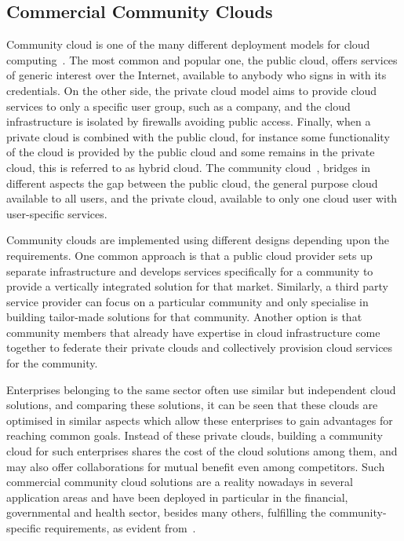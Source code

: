 
\subsection{Commercial Community Clouds}
\label{sec__community_clouds_enterprise}

Community cloud is one of the many different deployment models for cloud computing~\cite{Murugesan2015Encyclopedia}. %
The most common and popular one, the public cloud, offers services of generic interest over the Internet, 
available to anybody who signs in with its credentials. 
On the other side, the private cloud model aims to provide cloud services to only a specific user group, 
such as a company, and the cloud infrastructure is isolated by firewalls avoiding public access. 
Finally, when a private cloud is combined with the public cloud, for instance some functionality of the cloud is provided by the public cloud and some remains in the private cloud, this is referred to as hybrid cloud.
The community cloud~\cite{Khan2015CommunityClouds}, bridges in different aspects the gap between 
the public cloud, the general purpose cloud available to all users,
and the private cloud, available to only one cloud user with user-specific services. 

Community clouds are implemented using different designs depending upon the requirements. 
One common approach is that a public cloud provider sets up separate infrastructure and develops services specifically for a community to provide a vertically integrated solution for that market. 
Similarly, a third party service provider can focus on a particular community and only specialise in building tailor-made solutions for that community.
Another option is that community members that already have expertise in cloud infrastructure come together to federate their private clouds and collectively provision cloud services for the community. 

Enterprises belonging to the same sector often use similar but independent cloud solutions, and comparing these solutions, it can be seen that these clouds are optimised in similar aspects which allow these enterprises to gain advantages for reaching common goals. 
Instead of these private clouds, building a community cloud for such enterprises shares the cost of the cloud solutions among them, and may also offer collaborations for mutual benefit even among competitors.
Such commercial community cloud solutions are a reality nowadays in several application areas and have been deployed in particular in the financial, governmental and health sector, besides many others, fulfilling the community-specific requirements, as evident from~\cite{NYSE2012, Optum2012}.

